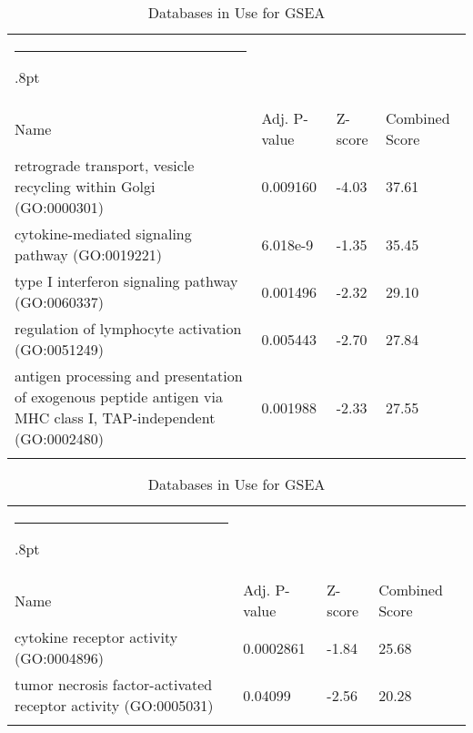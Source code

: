 \documentclass[3p,authoryear,preprint,12pt]{elsarticle}
\makeatletter
\def\hlinewd#1{%
  \noalign{\ifnum0=`}\fi\hrule \@height #1%
  \futurelet\reserved@a\@xhline}
\def\tbltoprule{\hlinewd{.8pt}\\[-12pt]}
\def\tblbottomrule{\noalign{\vspace*{6pt}}\hline\noalign{\vspace*{2pt}}}
\def\tblmidrule{\noalign{\vspace*{6pt}}\hline\noalign{\vspace*{2pt}}}
\makeatother
\begin{document}
\begin{table*}[!htbp]
	\caption{{Databases in Use for GSEA} }
	\label{tw-de478ae31cc6}
	\def\arraystretch{1}
	\ignorespaces 
	\centering 
	\begin{tabulary}{\linewidth}{p{\dimexpr.65\tabcolsep}p{\dimexpr.15\tabcolsep}p{\dimexpr.1\tabcolsep}p{\dimexpr.1\tabcolsep}}
		\tbltoprule Name & Adj. P-value & Z-score & Combined Score\\
		\tblmidrule
retrograde transport, vesicle recycling within Golgi (GO:0000301) & 0.009160 & -4.03 & 37.61 \\
cytokine-mediated signaling pathway (GO:0019221) & 6.018e-9 & -1.35 & 35.45 \\
type I interferon signaling pathway (GO:0060337) & 0.001496 & -2.32 & 29.10 \\
regulation of lymphocyte activation (GO:0051249) & 0.005443 & -2.70 & 27.84 \\
antigen processing and presentation of exogenous peptide antigen via MHC class I, TAP-independent (GO:0002480) & 0.001988 & -2.33 & 27.55 \\
		\tblbottomrule
	\end{tabulary}\par 
\end{table*}
\begin{table*}[!htbp]
	\caption{{Databases in Use for GSEA} }
	\label{tw-de478ae31cc6}
	\def\arraystretch{1}
	\ignorespaces 
	\centering 
	\begin{tabulary}{\linewidth}{p{\dimexpr.65\tabcolsep}p{\dimexpr.15\tabcolsep}p{\dimexpr.1\tabcolsep}p{\dimexpr.1\tabcolsep}}
		\tbltoprule Name & Adj. P-value & Z-score & Combined Score\\
		\tblmidrule
cytokine receptor activity (GO:0004896) & 0.0002861 & -1.84 & 25.68 \\
tumor necrosis factor-activated receptor activity (GO:0005031) & 0.04099 & -2.56 & 20.28 \\
		\tblbottomrule
	\end{tabulary}\par 
\end{table*}
\end{document}
